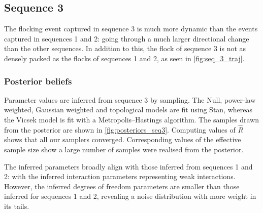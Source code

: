 \subsection{Sequence 3}

The flocking event captured in sequence 3 is much more dynamic than the
events captured in sequences 1 and 2: going through a much larger
directional change than the other sequences. In addition to this, the flock of
sequence 3 is not as densely packed as the flocks of sequences 1 and 2,
as seen in \cref{fig:seq_3_traj}.

\subsubsection{Posterior beliefs}

Parameter values are inferred from sequence 3 by sampling. The Null,
power-law weighted, Gaussian weighted and topological models are fit using
Stan, whereas the Vicsek model is fit with a Metropolis--Hastings algorithm.
The samples drawn from the posterior are shown in \cref{fig:posteriors_seq3}.
Computing values of $\widehat{R}$ shows that all our samplers converged.
Corresponding values of the effective sample size show a large number of
samples were realised from the posterior.

The inferred parameters broadly align with those inferred from sequences 1
and 2: with the inferred interaction parameters representing weak
interactions. However, the inferred degrees of freedom parameters are smaller
than those inferred for sequences 1 and 2, revealing a noise distribution
with more weight in its tails.


